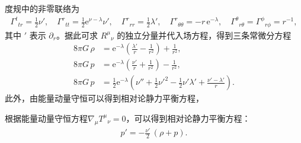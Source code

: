 度规中的非零联络为
\begin{align}
\Gamma^{t}{}_{tr}=\tfrac{1}{2}\nu',\quad
\Gamma^{r}{}_{tt}=\tfrac{1}{2}\mathrm{e}^{\nu-\lambda}\nu',\quad
\Gamma^{r}{}_{rr}=\tfrac{1}{2}\lambda',\quad
\Gamma^{r}{}_{\theta\theta}=-r\,\mathrm{e}^{-\lambda},\quad
\Gamma^{\theta}{}_{r\theta}=\Gamma^{\phi}{}_{r\phi}=r^{-1},\label{eq:christoffel}
\end{align}
其中 $'$ 表示 $\partial_{r}$。据此可求 $R^{\mu}{}_{\nu}$ 的独立分量并代入场方程，得到三条常微分方程
\begin{align}
8\pi G\,\rho&= \mathrm{e}^{-\lambda}\!\left(\frac{\lambda'}{r}-\frac{1}{r^{2}}\right)+\frac{1}{r^{2}},\label{eq:rho-eq}\\
8\pi G\,p&=\mathrm{e}^{-\lambda}\!\left(\frac{\nu'}{r}+\frac{1}{r^{2}}\right)-\frac{1}{r^{2}},\label{eq:p-eq1}\\
8\pi G\,p&=\tfrac{1}{2}\mathrm{e}^{-\lambda}\!\left(\nu''+\tfrac{1}{2}\nu'^{2}-\tfrac{1}{2}\nu'\lambda'+\frac{\nu'-\lambda'}{r}\right).\label{eq:p-eq2}
\end{align}
此外，由能量动量守恒可以得到相对论静力平衡方程，
\begin{theorem}[相对论静力平衡方程]
    根据能量动量守恒方程$\nabla_{\mu}T^{\mu}{}_{\nu}=0$，可以得到相对论静力平衡方程：
    \begin{align}
    p'=-\frac{\nu'}{2}\,(\rho+p).\label{eq:hydro-final}
    \end{align}
\end{theorem}
